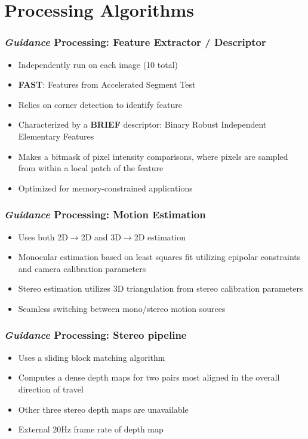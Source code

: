 \documentclass{beamer}
\begin{document}
\section{Processing Algorithms}
\begin{frame}
\frametitle{\textit{Guidance} Processing: Feature Extractor / Descriptor}

\begin{itemize}
\item{Independently run on each image (10 total)}
\item{\textbf{FAST}: Features from Accelerated Segment Test}
\item{Relies on corner detection to identify feature}
\item{Characterized by a \textbf{BRIEF} descriptor: Binary Robust Independent Elementary Features}
\item{Makes a bitmask of pixel intensity comparisons, where pixels are sampled from within a local patch of the feature}
\item{Optimized for memory-constrained applications}
\end{itemize}

\end{frame}

\begin{frame}
\frametitle{\textit{Guidance} Processing: Motion Estimation}
\begin{itemize}
\item{Uses both 2D$\rightarrow$2D and 3D$\rightarrow$2D estimation}
\item{Monocular estimation based on least squares fit utilizing epipolar constraints and camera calibration parameters}
\item{Stereo estimation utilizes 3D triangulation from stereo calibration parameters}
\item{Seamless switching between mono/stereo motion sources}

\end{itemize}
\end{frame}

\begin{frame}
\frametitle{\textit{Guidance} Processing: Stereo pipeline}
\begin{itemize}
\item{Uses a sliding block matching algorithm}
\item{Computes a dense depth maps for two pairs most aligned in the overall direction of travel}
\item{Other three stereo depth maps are unavailable}
\item{External 20Hz frame rate of depth map}

\end{itemize}
\end{frame}
\end{document}
